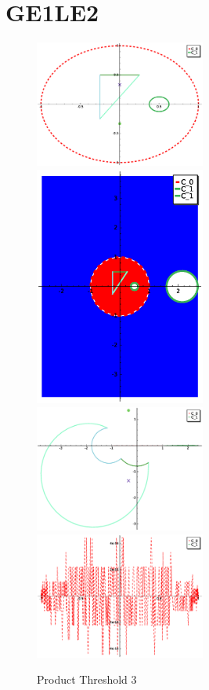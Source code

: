 \documentclass[a4paper,10pt]{article}
\begin{document}
\section{GE1LE2}
\graphicspath{{./GE1LE2PT3/}}
\begin{figure}[!ht]
\caption{Product Threshold 3}
\includegraphics[width=0.5\textwidth]{circle_plot.eps}
\includegraphics[width=0.5\textwidth]{Fundamental_domain.eps}
\includegraphics[width=0.5\textwidth]{zedplot.eps}
\includegraphics[width=0.5\textwidth]{zedplot_C0.eps}
\end{figure}
\end{document}
